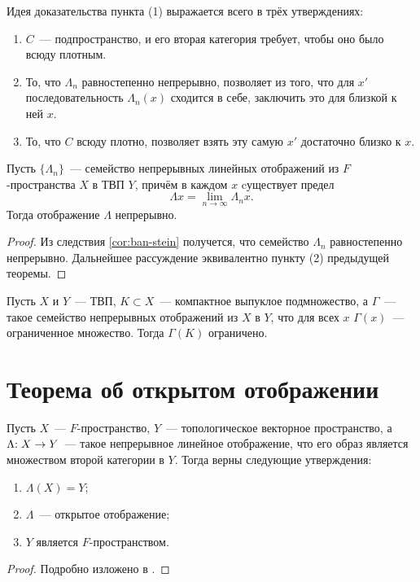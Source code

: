 \documentclass{notes}
\begin{document}
	\begin{rem}
		Идея доказательства пункта (1) выражается всего в трёх утверждениях:
		\begin{enumerate}
			\item $C$~--- подпространство, и его вторая категория требует, чтобы оно было всюду плотным.
			\item То, что $\Lambda_n$ равностепенно непрерывно, позволяет из того, что для $x'$ последовательность $\Lambda_n(x)$ сходится в себе, заключить это для близкой к ней $x$. 
			\item То, что $C$ всюду плотно, позволяет взять эту самую $x'$ достаточно близко к $x$.
 		\end{enumerate}
	\end{rem}

	\begin{thm} \label{thm:lim-cont-1}
		Пусть $\{\Lambda_n\}$~--- семейство непрерывных линейных отображений из $F$-пространства $X$ в ТВП $Y$, причём в каждом $x$ cуществует предел
		\[
			\Lambda x = \lim\limits_{n \to \infty} \Lambda_n x.
		\]
		Тогда отображение $\Lambda$ непрерывно.
		\begin{proof}
			Из следствия \ref{cor:ban-stein} получется, что семейство $\Lambda_n$ равностепенно непрерывно. Дальнейшее рассуждение эквивалентно пункту (2) предыдущей теоремы. 
		\end{proof}
	\end{thm}

	\begin{thm}
		Пусть $X$ и $Y$~--- ТВП, $K \subset X$~--- компактное выпуклое подмножество, а $\Gamma$~--- такое семейство непрерывных отображений из $X$ в $Y$, что для всех $x$ $\Gamma(x)$~--- ограниченное множество. Тогда $\Gamma(K)$ ограничено.
	\end{thm}

\section{Теорема об открытом отображении}
	
	\begin{thm} \label{thm:open-map}
		Пусть $X$~--- $F$-пространство, $Y$~--- топологическое векторное пространство, а $\Lambda\text{\text{:}} \; X \to Y$~--- такое непрерывное линейное отображение, что его образ является множеством второй категории в $Y$. Тогда верны следующие утверждения:
		\begin{enumerate}
			\item $\Lambda(X) = Y$;
			\item $\Lambda$~--- открытое отображение;
			\item $Y$ является $F$-пространством.
		\end{enumerate}
		\begin{proof}
			Подробно изложено в \cite[с. 58--60]{R}.
		\end{proof}
	\end{thm}
\end{document}

